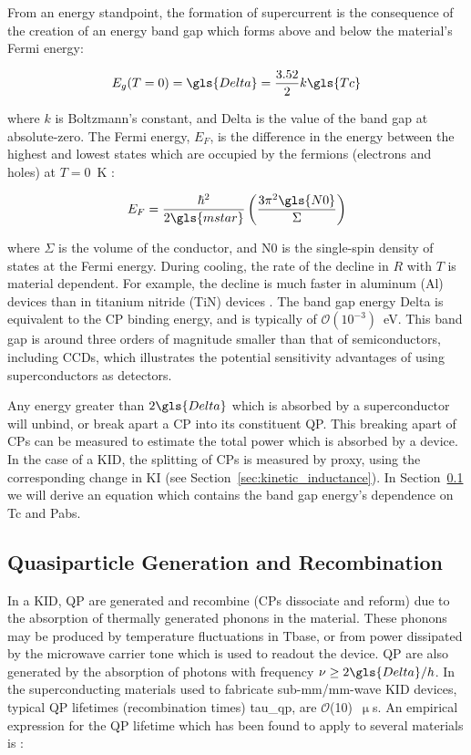 From an energy standpoint, the formation of supercurrent is the consequence of the creation of an energy band gap which forms above and below the material's Fermi energy:

\begin{equation}\label{eq:bandgap}
  E_{g}(T = 0) = \gls{Delta} = \frac{3.52}{2}k\gls{Tc}
\end{equation}

where $k$ is Boltzmann's constant, and \gls{Delta} is the value of the band gap at absolute-zero. The Fermi energy, $E_{F}$, is the difference in the energy between the highest and lowest states which are occupied by the fermions (electrons and holes) at $T = 0$~K \citep{kittel1998thermal}:

\begin{equation}\label{eq:Fermi_energy}
  E_{F} = \frac{\hbar^{2}}{2 \gls{mstar}}\left( \frac{3 \pi^{2} \gls{N0}}{\Sigma} \right)
\end{equation}

where $\Sigma$ is the volume of the conductor, and \gls{N0} is the single-spin density of states at the Fermi energy. During cooling, the rate of the decline in $R$ with $T$ is material dependent. For example, the decline is much faster in aluminum (Al) devices than in titanium nitride (TiN) devices \citep{mauskopf2018transition}. The band gap energy \gls{Delta} is equivalent to the CP binding energy, and is typically of $\mathcal{O}(10^{-3})$~eV. This band gap is around three orders of magnitude smaller than that of semiconductors, including CCDs, which illustrates the potential sensitivity advantages of using superconductors as detectors.

Any energy greater than $2\gls{Delta}$ which is absorbed by a superconductor will unbind, or break apart a CP into its constituent QP\@. This breaking apart of CPs can be measured to estimate the total power which is absorbed by a device. In the case of a KID, the splitting of CPs is measured by proxy, using the corresponding change in KI (see Section~\ref{sec:kinetic_inductance}). In Section~\ref{QP} we will derive an equation which contains the band gap energy's dependence on \gls{Tc} and \gls{Pabs}.

\subsection{Quasiparticle Generation and Recombination}\label{QP}

In a KID, QP are generated and recombine (CPs dissociate and reform) due to the absorption of thermally generated phonons in the material. These phonons may be produced by temperature fluctuations in \gls{Tbase}, or from power dissipated by the microwave carrier tone which is used to readout the device. QP are also generated by the absorption of photons with frequency $\nu \geq 2\gls{Delta}/h$. In the superconducting materials used to fabricate sub-mm/mm-wave KID devices, typical QP lifetimes (recombination times) \gls{tau_qp}, are $\mathcal{O}$(10)~$\upmu$s. An empirical expression for the QP lifetime which has been found to apply to several materials is \citep{zmuidzinas2012superconducting}:

